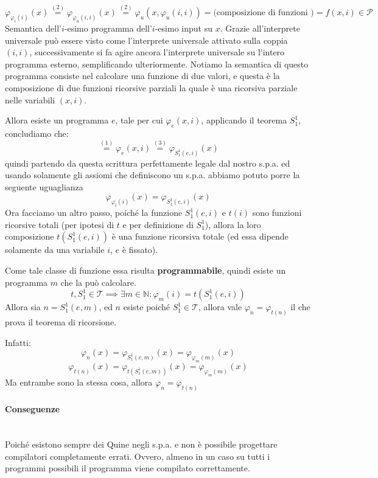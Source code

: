 \documentclass{article}
\begin{document}
$$\varphi_{\varphi_i(i)}(x)\overset{(2)}{=}\varphi_{\varphi_u(i,i)}(x)\overset{(2)}{=}\varphi_u(x,\varphi_u(i,i))=\text{(composizione di funzioni )}=f(x,i)\in\mathcal{P}$$
Semantica dell'$i$-esimo programma dell'$i$-esimo input su $x$. Grazie all'interprete
universale può essere visto come l'interprete universale attivato sulla coppia $(i,i)$,
successivamente si fa agire ancora l'interprete universale su l'intero programma esterno,
semplificando ulteriormente. Notiamo la semantica di questo programma consiste nel calcolare
una funzione di due valori, e questa è la composizione di due funzioni ricorsive parziali
la quale è una ricorsiva parziale nelle variabili $(x,i)$.

Allora esiste un programma $e$, tale per cui $\varphi_e(x,i)$, applicando il teorema $S_1^1$,
concludiamo che:
$$\overset{(1)}{=}\varphi_e(x,i)\overset{(3)}{=}\varphi_{S_1^1(e,i)}(x)$$
quindi partendo da questa scrittura perfettamente legale dal nostro s.p.a. ed
usando solamente gli assiomi che definiscono un s.p.a. abbiamo potuto porre la seguente uguaglianza
$$\varphi_{\varphi_i(i)}(x)=\varphi_{S_1^1(e,i)}(x)$$
Ora facciamo un altro passo, poiché la funzione $S_1^1(e,i)$ e $t(i)$ sono
funzioni ricorsive totali (per ipotesi di $t$ e per definizione di $S_1^1$),
allora la loro composizione $t(S_1^1(e,i))$ è una funzione ricorsiva totale (ed essa dipende solamente da una variabile
$i$, $e$ è fissato).

Come tale classe di funzione essa risulta \textbf{programmabile}, quindi
esiste un programma $m$ che la può calcolare.
$$t,S_1^1\in\mathcal{T}\implies\exists m\in\mathbb{N}:\varphi_m(i)=t(S_1^1(e,i))$$
Allora sia $n=S_1^1(e,m)$, ed $n$ esiste poiché $S_1^1\in\mathcal{T}$, allora
vale $\varphi_n=\varphi_{t(n)}$ il che prova il teorema di ricorsione.

Infatti:
$$\varphi_n(x)=\varphi_{S_1^1(e,m)}(x)=\varphi_{\varphi_m(m)}(x)$$
$$\varphi_{t(n)}(x)=\varphi_{t(S_1^1(e,m))}(x)=\varphi_{\varphi_m(m)}(x)$$
Ma entrambe sono la stessa cosa, allora $\varphi_n=\varphi_{t(n)}$

\paragraph{Conseguenze}\mbox{}\\
Poiché esistono sempre dei Quine negli s.p.a. e non è possibile progettare compilatori completamente
errati. Ovvero, almeno in un caso su tutti i programmi possibili il programma viene compilato
correttamente.
\end{document}
